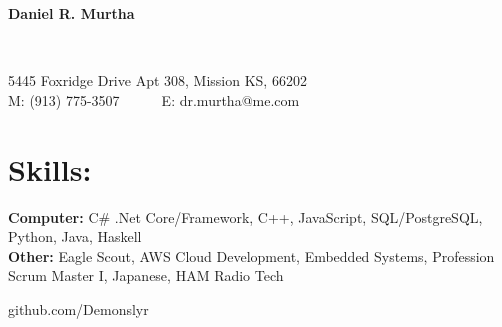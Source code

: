 \documentclass{res}
\begin{document}
\begin{resume}
\begin{changemargin}{-0.5in}{0in}
	\begin{center}
		\begin{Huge}
		\textbf{Daniel R. Murtha}
		\end{Huge}
	\\
		\begin{normalsize}
			5445 Foxridge Drive Apt 308, Mission KS, 66202\\
			M: (913) 775-3507~~~~~~E: dr.murtha@me.com
		\end{normalsize}
	\end{center}
\end{changemargin}\vspace{-5pt}
 \section{Skills:}\vspace{-10pt}
 \begin{minipage}{0.8\linewidth}
 	\begin{small}
 		\begin{flushleft}
 			{\bf Computer: }C\# .Net Core/Framework, C++, JavaScript, SQL/PostgreSQL, Python, Java, Haskell\\
			{\bf Other: } Eagle Scout, AWS Cloud Development, Embedded Systems, Profession Scrum Master I, Japanese, HAM Radio Tech
 		\end{flushleft}
 	\end{small}   
 \end{minipage}
 \begin{minipage}{0.2\linewidth}
 	\begin{small}   
		\begin{flushright}
			github.com/Demonslyr\\
		\end{flushright}     
 	\end{small}   
 \end{minipage}\vspace{-10pt}
 

\end{resume}
\end{document}
